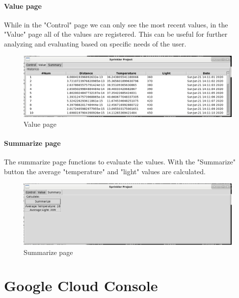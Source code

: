\documentclass{article}
\begin{document}
\paragraph{Value page}
While in the "Control" page we can only see the most recent values, in the "Value" page all of the values are registered. This can be useful for further analyzing and evaluating based on specific needs of the user. 
\begin{figure}
    \centering
    \includegraphics[scale=0.3]{value_view.png}
	\caption{Value page}
	\label{fig:value}
\end{figure}
\paragraph{Summarize page}
The summarize page functions to evaluate the values. With the "Summarize" button the average "temperature" and "light" values are calculated. 
\begin{figure}
     \centering
	\includegraphics[scale=0.3]{summarize_view.png}
	\caption{Summarize page}
	\label{fig:summarize}
\end{figure}

\section{Google Cloud Console}
\end{document}
